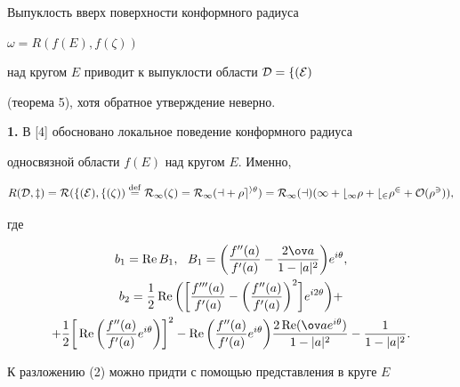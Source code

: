 Выпуклость вверх поверхности конформного радиуса 


$\omega=R(f(E),f(\zeta))$ 


над кругом $E$ приводит к выпуклости области $\cal D=f(E)$ 


(теорема 5), хотя обратное утверждение неверно. \addtocounter{equation}{1}


\medskip 


 


{\bf 1.} В [4] обосновано локальное поведение конформного радиуса 


односвязной области $f(E)$ над кругом $E$. Именно,


\begin{equation} 


R(\cal D,z)=R(f(E),f(\zeta))\eqdef R_1(\zeta)= 


R_1(a+\rho e^{i\theta})=R_1(a)(1+b_1\rho+b_2\rho^2+ 


O(\rho^3)), 


\end{equation} 


где 


\begin{gather} 


b_1=\re B_1,\ \ B_1=\bigg(\frac{f''(a)}{f'(a)}- 


\frac{2\ov a}{1-|a|^2} \bigg)e^{i\theta},\\ 


% 


b_2=\frac{1}{2}\re\bigg(\bigg[\frac{f'''(a)}{f'(a)}- 


\bigg(\frac{f''(a)}{f'(a)}\bigg)^2\bigg]e^{i2\theta}\bigg)+\notag \\


+\frac{1}{2}\bigg[\re\bigg(\frac{f''(a)}{f'(a)}e^{i\theta} 


\bigg)\bigg]^2-\re\bigg(\frac{f''(a)}{f'(a)}e^{i\theta} \bigg) 


\frac{2\re(\ov a e^{i\theta})}{1-|a|^2}-\frac{1}{1-|a|^2}. 


\end{gather} 


 


К разложению (2) можно придти с помощью представления в круге $E$ 


